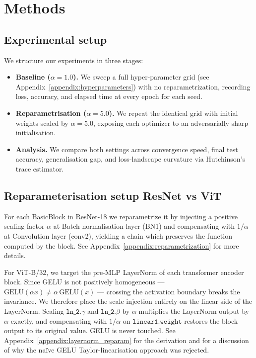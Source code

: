 \documentclass{article}
\begin{document}
\section{Methods}
\subsection{Experimental setup}
We structure our experiments in three stages:
\begin{itemize}[noitemsep,topsep=2pt]
    \item \textbf{Baseline ($\alpha=1.0$).} We sweep a full hyper-parameter grid (see Appendix~\ref{appendix:hyperparameters}) with no reparametrization, recording loss, accuracy, and elapsed time at every epoch for each seed.
    \item \textbf{Reparametrisation ($\alpha=5.0$).} We repeat the identical grid with initial weights scaled by $\alpha=5.0$, exposing each optimizer to an adversarially sharp initialisation.
    \item \textbf{Analysis.} We compare both settings across convergence speed, final test accuracy, generalisation gap, and loss-landscape curvature via Hutchinson's trace estimator.
\end{itemize}

\subsection{Reparameterisation setup ResNet vs ViT}

For each BasicBlock in ResNet-18 we reparametrize it by injecting a positive scaling factor $\alpha$ at Batch normalisation layer (BN1) and compensating with $1/\alpha$ at Convolution layer (conv2), yielding a chain which preserves the function computed by the block. See Appendix~\ref{appendix:reparametrization} for more details.

For ViT-B/32, we target the pre-MLP LayerNorm of each transformer encoder block. Since GELU is not positively homogeneous — $\text{GELU}(\alpha x)\neq\alpha\,\text{GELU}(x)$ — crossing the activation boundary breaks the invariance. We therefore place the scale injection entirely on the linear side of the LayerNorm. Scaling $\texttt{ln\_2}.\gamma$ and $\texttt{ln\_2}.\beta$ by $\alpha$ multiplies the LayerNorm output by $\alpha$ exactly, and compensating with $1/\alpha$ on $\texttt{linear1.weight}$ restores the block output to its original value. GELU is never touched. See Appendix~\ref{appendix:layernorm_reparam} for the derivation and for a discussion of why the na\"ive GELU Taylor-linearisation approach was rejected.
\end{document}
